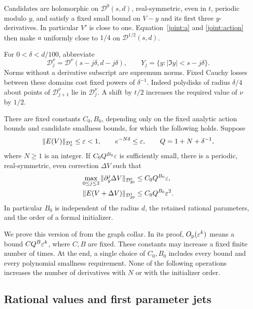 Candidates are holomorphic on \(\mathcal D^0(s,d)\), real-symmetric,
even in \(t\), periodic modulo \(y\), and satisfy a fixed small bound
on \(V-y\) and its first three \(y\)-derivatives.  In particular
\(V'\) is close to one.  Equation~\eqref{joint:a} and
\eqref{joint:action} then make \(a\) uniformly close to \(1/4\) on
\(\mathcal D^{1/2}(s,d)\).

For \(0<\delta<d/100\), abbreviate
\[
 \mathcal D_j^\nu=\mathcal D^\nu(s-j\delta,d-j\delta),
 \qquad Y_j=\{y:|\Im y|<s-j\delta\}.
\]
Norms without a derivative subscript are supremum norms.  Fixed Cauchy
losses between these domains cost fixed powers of \(\delta^{-1}\).
Indeed polydisks of radius \(\delta/4\) about points of
\(\mathcal D_{j+1}^\nu\) lie in \(\mathcal D_j^\nu\).  A shift by
\(t/2\) increases the required value of \(\nu\) by \(1/2\).

\begin{proposition}
\label{joint:newton}
There are fixed constants \(C_0,B_0\), depending only on the fixed
analytic action bounds and candidate smallness bounds, for which the
following holds.  Suppose
\[
 \|E(V)\|_{\mathcal D_0^1}\le\varepsilon<1,
 \qquad e^{-N\delta}\le\varepsilon,
 \qquad Q=1+N+\delta^{-1},
\]
where \(N\ge1\) is an integer.  If \(C_0Q^{B_0}\varepsilon\) is sufficiently
small, there is a periodic, real-symmetric, even correction \(\Delta V\)
such that
\begin{align}
 \max_{0\le j\le3}\|\partial_y^j\Delta V\|_{\mathcal D_{20}^0}
   &\le C_0Q^{B_0}\varepsilon,
   \label{joint:step-size}\\
 \|E(V+\Delta V)\|_{\mathcal D_{20}^1}
   &\le C_0Q^{B_0}\varepsilon^2.
   \label{joint:step-error}
\end{align}
In particular \(B_0\) is independent of the radius \(d\), the retained
rational parameters, and the order of a formal initializer.
\end{proposition}

We prove this version of \cite[Proposition~3.3]{NB} from the graph
collar.  In its proof, \(O_{\mathrm p}(\varepsilon^k)\) means a bound
\(CQ^B\varepsilon^k\), where \(C,B\) are fixed.  These constants may increase
a fixed finite number of times.  At the end, a single choice of
\(C_0,B_0\) includes every bound and every polynomial smallness
requirement.  None of the following operations increases the number of
derivatives with \(N\) or with the initializer order.

\subsection{Rational values and first parameter jets}

